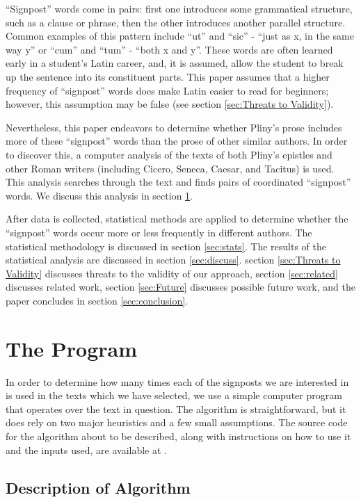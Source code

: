 ``Signpost'' words come in pairs: first one introduces some grammatical structure, such as a clause or phrase, then the other introduces another parallel structure. Common examples of this pattern include ``ut'' and ``sic'' - ``just as x, in the same way y'' or ``cum'' and ``tum'' - ``both x and y''. These words are often learned early in a student's Latin career, and, it is assumed, allow the student to break up the sentence into its constituent parts. This paper assumes that a higher frequency of ``signpost'' words does make Latin easier to read for beginners; however, this assumption may be false (see section \ref{sec:Threats to Validity}).

Nevertheless, this paper endeavors to determine whether Pliny's prose includes more of these ``signpost'' words than the prose of other similar authors. In order to discover this, a computer analysis of the texts of both Pliny's epistles and other Roman writers (including Cicero, Seneca, Caesar, and Tacitus) is used. This analysis searches through the text and finds pairs of coordinated ``signpost'' words. We discuss this analysis in section \ref{sec:The Program}.
 
After data is collected, statistical methods are applied to determine whether the ``signpost'' words occur more or less frequently in different authors. The statistical methodology is discussed in section \ref{sec:stats}. The results of the statistical analysis are discussed in section \ref{sec:discuss}. section \ref{sec:Threats to Validity} discusses threats to the validity of our approach, section \ref{sec:related} discusses related work, section \ref{sec:Future} discusses possible future work, and the paper concludes in section \ref{sec:conclusion}.

\section{The Program}
\label{sec:The Program}

In order to determine how many times each of the signposts we are interested in is used in the texts which we have selected, we use a simple computer program that operates over the text in question. The algorithm is straightforward, but it does rely on two major heuristics and a few small assumptions. The source code for the algorithm about to be described, along with instructions on how to use it and the inputs used, are available at \cite{github}.

\subsection{Description of Algorithm}

